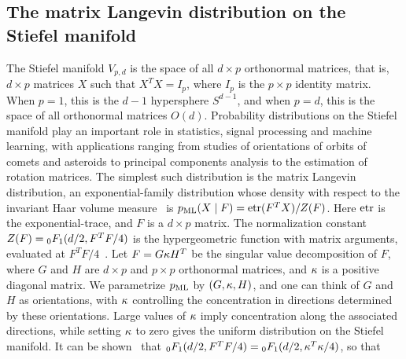 
\subsection{The matrix Langevin distribution on the Stiefel manifold} \label{sec:stief_intr}
The Stiefel manifold $V_{p,d}$ is the space of all $d \times p$ orthonormal matrices, %
that is, $d \times p$ matrices $X$ such that $X^TX=I_p$, where $I_p$ is the $p \times p$  identity matrix.
When $p=1$, this is the $d-1$ hypersphere $S^{d-1}$, and when $p=d$, this is the space of all orthonormal matrices
$O(d)$.
Probability distributions on the Stiefel manifold play an important role in statistics, signal processing and machine learning, with applications ranging 
from studies of orientations of orbits of comets and asteroids to principal components analysis to the estimation of rotation matrices.  
The simplest such distribution is the matrix Langevin distribution,
an exponential-family distribution whose density with respect to the invariant Haar
volume measure~\citep{Edelman98thegeometry} is
$\ml(X\mid F)=\etr(F^TX)/Z(F)$. %
Here $\etr$ is the exponential-trace, and $F$ is a $d\times p$ matrix. The normalization constant $Z(F)=\mathstrut_0F_1(d/2, F^TF/4)$  is the hypergeometric
function  with matrix arguments, evaluated at $F^TF/4$~\citep{chikusebook}.
Let $F = G \kappa H^T$ be the singular value decomposition of $F$, where $G$ and $H$ are $d \times p$ and $p \times p$ orthonormal matrices, and $\kappa$ is
a positive diagonal matrix. 
We parametrize $\ml$ by $(G, \kappa, H)$, and one can think of $G$ and $H$ as orientations, with $\kappa$ controlling the
concentration in directions determined by these orientations.
Large values of $\kappa$ imply concentration along the associated directions, while setting $\kappa$ to zero gives the uniform distribution on
the Stiefel manifold. It can be shown~\citep{khatri1977} that $\mathstrut_0F_1(d/2, F^TF/4) =  \mathstrut_0F_1(d/2, \kappa^T\kappa/4)$, so that
